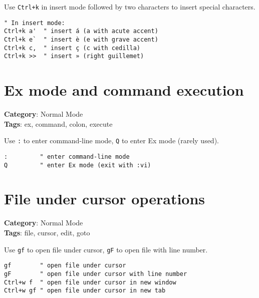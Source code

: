 {{{{{{{{{{Use {\footnotesize \Verb§Ctrl+k§} in insert mode followed by two characters to insert special characters.

\begin{Exa*}{}
\begin{Verbatim}[fontsize=\footnotesize, breaklines, breakanywhere]
" In insert mode:
Ctrl+k a'  " insert á (a with acute accent)
Ctrl+k e`  " insert è (e with grave accent)
Ctrl+k c,  " insert ç (c with cedilla)
Ctrl+k >>  " insert » (right guillemet)
\end{Verbatim}
\end{Exa*}

\section{Ex mode and command execution}

\textbf{Category}: Normal Mode\\ \textbf{Tags}: ex, command, colon, execute
\vspace{0.5cm}

Use {\footnotesize \Verb§:§} to enter command-line mode, {\footnotesize \Verb§Q§} to enter Ex mode (rarely used).

\begin{Exa*}{}
\begin{Verbatim}[fontsize=\footnotesize, breaklines, breakanywhere]
:         " enter command-line mode
Q         " enter Ex mode (exit with :vi)
\end{Verbatim}
\end{Exa*}

\section{File under cursor operations}

\textbf{Category}: Normal Mode\\ \textbf{Tags}: file, cursor, edit, goto
\vspace{0.5cm}

Use {\footnotesize \Verb§gf§} to open file under cursor, {\footnotesize \Verb§gF§} to open file with line number.

\begin{Exa*}{}
\begin{Verbatim}[fontsize=\footnotesize, breaklines, breakanywhere]
gf        " open file under cursor
gF        " open file under cursor with line number
Ctrl+w f  " open file under cursor in new window
Ctrl+w gf " open file under cursor in new tab
\end{Verbatim}
\end{Exa*}

}}}}}}}}}}
